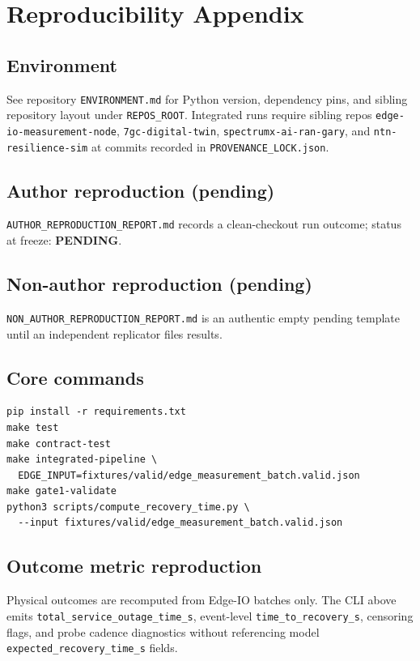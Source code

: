 \section{Reproducibility Appendix}
\label{app:repro}

\subsection{Environment}
See repository \texttt{ENVIRONMENT.md} for Python version, dependency pins, and sibling repository layout under \texttt{REPOS\_ROOT}.
Integrated runs require sibling repos \texttt{edge-io-measurement-node}, \texttt{7gc-digital-twin}, \texttt{spectrumx-ai-ran-gary}, and \texttt{ntn-resilience-sim} at commits recorded in \texttt{PROVENANCE\_LOCK.json}.

\subsection{Author reproduction (pending)}
\texttt{AUTHOR\_REPRODUCTION\_REPORT.md} records a clean-checkout run outcome; status at freeze: \textbf{PENDING}.

\subsection{Non-author reproduction (pending)}
\texttt{NON\_AUTHOR\_REPRODUCTION\_REPORT.md} is an authentic empty pending template until an independent replicator files results.

\subsection{Core commands}
\begin{verbatim}
pip install -r requirements.txt
make test
make contract-test
make integrated-pipeline \
  EDGE_INPUT=fixtures/valid/edge_measurement_batch.valid.json
make gate1-validate
python3 scripts/compute_recovery_time.py \
  --input fixtures/valid/edge_measurement_batch.valid.json
\end{verbatim}

\subsection{Outcome metric reproduction}
Physical outcomes are recomputed from Edge-IO batches only.
The CLI above emits \texttt{total\_service\_outage\_time\_s}, event-level \texttt{time\_to\_recovery\_s}, censoring flags, and probe cadence diagnostics without referencing model \texttt{expected\_recovery\_time\_s} fields.

